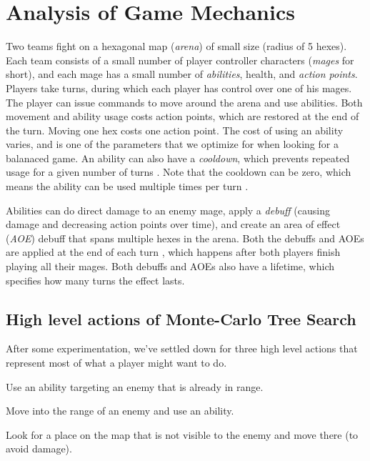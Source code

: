 \chapter{Analysis of Game Mechanics}

Two teams fight on a hexagonal map (\emph{arena}) of small size (radius of 5
hexes).   Each team consists of a small number of
player controller characters (\emph{mages} for short), and each mage has a small
number of \emph{abilities}, health, and \emph{action points}. Players take turns,
during which each player has control over one of his mages. The player can
issue commands to move around the arena and use abilities. Both movement and
ability usage costs action points, which are restored at the end of the turn.
Moving one hex costs one action point. The cost of using an ability varies, and
is one of the parameters that we optimize for when looking for a balanaced
game. An ability can also have a \emph{cooldown}, which prevents repeated usage
for a given number of turns . Note that the
cooldown can be zero, which means the ability can be used multiple times per
turn .

Abilities can do direct damage to an enemy mage, apply a \emph{debuff} (causing
damage and decreasing action points over time), and create an area of effect
(\emph{AOE}) debuff that spans multiple hexes in the arena. Both the debuffs and
AOEs are applied at the end of each turn , which happens after both players finish playing all their mages.
Both debuffs and AOEs also have a lifetime, which specifies how many turns
 the effect lasts.




\section{High level actions of Monte-Carlo Tree Search}

After some experimentation, we've settled down for three high level actions
that represent most of what a player might want to do.

\begin{description}[align=right,labelwidth=3cm]
\item [AbilityUse] Use an ability targeting an enemy that is already in range.
\item [AttackMove] Move into the range of an enemy and use an ability.
\item [DefensiveMove] Look for a place on the map that is not visible to the enemy and move there (to avoid damage).
\end{description}

